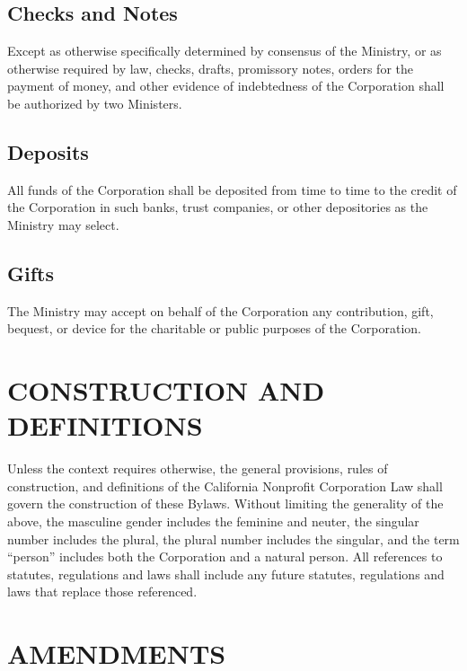 \documentclass[letterpaper,titlepage]{article}
\begin{document}
\subsection{Checks and Notes}
\label{sec:checksNotes}
Except as otherwise specifically determined by consensus of the Ministry, or as otherwise required by law, checks, drafts, promissory notes, orders for the payment of money, and other evidence of indebtedness of the Corporation shall be authorized by two Ministers. 
\subsection{Deposits}
\label{sec:deposits}
All funds of the Corporation shall be deposited from time to time to the credit of the Corporation in such banks, trust companies, or other depositories as the Ministry may select.
\subsection{Gifts}
\label{sec:gifts}
The Ministry may accept on behalf of the Corporation any contribution, gift, bequest, or device for the charitable or public purposes of the Corporation.
\section{CONSTRUCTION AND DEFINITIONS}
\label{sec:constructionDefinitions}
Unless the context requires otherwise, the general provisions, rules of
construction, and definitions of the California Nonprofit Corporation Law shall
govern the construction of these Bylaws. Without limiting the generality of the
above, the masculine gender includes the feminine and neuter, the singular
number includes the plural, the plural number includes the singular, and the
term ``person'' includes both the Corporation and a natural person. All references to statutes, regulations and laws shall include any future statutes, regulations and laws that replace those referenced.
\section{AMENDMENTS}
\label{sec:amendments}
\end{document}
